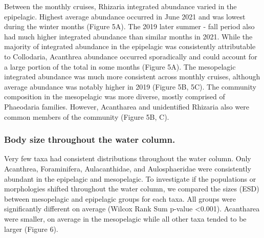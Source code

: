 \documentclass[
]{article}
\begin{document}
Between the monthly cruises, Rhizaria integrated abundance varied in the
epipelagic. Highest average abundance occurred in June 2021 and was
lowest during the winter months (Figure 5A). The 2019 later summer -
fall period also had much higher integrated abundance than similar
months in 2021. While the majority of integrated abundance in the
epipelagic was consistently attributable to Collodaria, Acanthrea
abundance occurred sporadically and could account for a large portion of
the total in some months (Figure 5A). The mesopelagic integrated
abundance was much more consistent across monthly cruises, although
average abundance was notably higher in 2019 (Figure 5B, 5C). The
community composition in the mesopelagic was more diverse, mostly
comprised of Phaeodaria families. However, Acantharea and unidentified
Rhizaria also were common members of the community (Figure 5B, C).

\hypertarget{body-size-throughout-the-water-column.}{%
\subsubsection{Body size throughout the water
column.}\label{body-size-throughout-the-water-column.}}

Very few taxa had consistent distributions throughout the water column.
Only Acanthrea, Foraminifera, Aulacanthidae, and Aulosphaeridae were
consistently abundant in the epipelagic and mesopelagic. To investigate
if the populations or morphologies shifted throughout the water column,
we compared the sizes (ESD) between mesopelagic and epipelagic groups
for each taxa. All groups were significantly different on average
(Wilcox Rank Sum p-value \textless0.001). Acantharea were smaller, on
average in the mesopelagic while all other taxa tended to be larger
(Figure 6).
\end{document}
